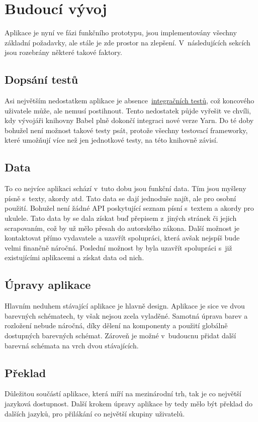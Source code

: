 \section{Budoucí vývoj}
\label{sc:upcomming_development}
Aplikace je nyní ve fázi funkčního prototypu, jsou implementovány všechny základní požadavky, ale stále je zde prostor na zlepšení. V~následujících sekcích jsou rozebrány některé takové faktory.

\subsection{Dopsání testů}
Asi největším nedostatkem aplikace je absence~\hyperref[sc:unit_tests]{integračních testů}, což koncového uživatele může, ale nemusí postihnout. Tento nedostatek půjde vyřešit ve chvíli, kdy vývojáři knihovny Babel plně dokončí integraci nové verze Yarn. Do té doby bohužel není možnost takové testy psát, protože všechny testovací frameworky, které umožňují více než jen jednotkové testy, na této knihovně závisí.

\subsection{Data}
To co nejvíce aplikaci schází v~tuto dobu jsou funkční data. Tím jsou myšleny písně s~texty, akordy atd. Tato data se dají jednoduše najít, ale pro osobní použití. Bohužel není žádné API poskytující seznam písní s~textem a akordy pro ukulele. Tato data by se dala získat buď přepisem z~jiných stránek či jejich scrapovaním, což by už mělo přesah do autorského zákona. Další možnost je kontaktovat přímo vydavatele a uzavřít spolupráci, která avšak nejspíš bude velmi finančně náročná. Poslední možnost by byla uzavřít spolupráci s~již existujícími aplikacemi a získat data od nich.

\subsection{Úpravy aplikace}
Hlavním neduhem stávající aplikace je hlavně design. Aplikace je sice ve dvou barevných schématech, ty však nejsou zcela vyladěné. Samotná úprava barev a rozložení nebude náročná, díky dělení na komponenty a použití globálně dostupných barevných schémat. Zároveň je možné v~budoucnu přidat další barevná schémata na vrch dvou stávajících.

\subsection{Překlad}
Důležitou součástí aplikace, která míří na mezinárodní trh, tak je co největší jazyková dostupnost. Další krokem úpravy aplikace by tedy mělo být překlad do dalších jazyků, pro přilákání co největší skupiny uživatelů.

